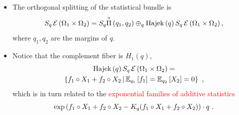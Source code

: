 \documentclass[xcolor=svgnames]{beamer}
\DeclareMathOperator{\Hajek}{Hajek}
\newcommand{\hajekof}[1]{\Hajek\left(#1\right)}
\newcommand{\openplan}[2]{\overset{\circ}\Pi\left(#1,#2\right)}
\newcommand{\rosso}[1]{\textcolor{red}{#1}}
\renewcommand{\emph}{\rosso}
\begin{document}
\begin{frame}
\begin{itemize}
\item The orthogonal splitting of the statistical bundle is
\begin{equation*}
    \expfiberat q {\Omega_1 \times \Omega_2} = S_q \openplan{q_1}{q_2} \oplus_q \hajekof{q}\expfiberat q {\Omega_1 \times \Omega_2},
\end{equation*}
where $q_1, q_2$ are the margins of $q$.

\item Notice that the complement fiber is $H_1(q)$,
\begin{multline*}
  \hajekof{q}\expfiberat q {\Omega_1 \times \Omega_2} = \\ \setof {f_1 \circ X_1 + f_2 \circ X_2}{\expectat {q_1}{f_1} = \expectat {q_2}{X_2} = 0} \ ,
 \end{multline*}
  which is in turn related to the \emph{exponential families of additive statistics} 
  \begin{equation*}
      \exp\left(f_1 \circ X_1 + f_2 \circ X_2 - K_q(f_1 \circ X_1 + f_2 \circ X_2)\right) \cdot q \ .
  \end{equation*}
\end{itemize}
\end{frame}
\end{document}
